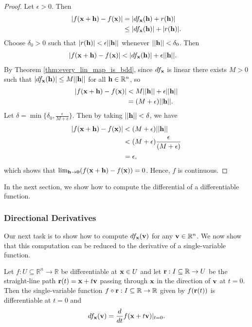 \documentclass[12pt,letterpaper,reqno]{article}
\numberwithin{equation}{section}
\newcommand{\bh}{{\bf h}}
\newcommand{\R}{\ensuremath{\mathbb R}}
\newcommand{\zv}{{\bf 0}}
\newcommand{\bv}{{\bf v}}
\newcommand{\bx}{{\bf x}}
\newcommand{\bbr}{{\bf r}}
\begin{document}
{\begin{proof}
	Let $\epsilon>0$. Then
	\begin{align*}
		|f(\bx+\bh)-f(\bx)|&=|df_\bx(\bh)+r(\bh)| \\
		&\leq |df_\bx(\bh)|+|r(\bh)|.
	\end{align*}
Choose $\delta_0>0$ such that $|r(\bh)|<\epsilon ||\bh||$ whenever $||\bh||<\delta_0$. Then
\begin{align*}
	|f(\bx+\bh)-f(\bx)|&<|df_\bx(\bh)|+\epsilon ||\bh||.
\end{align*}
By Theorem \ref{thm:every_lin_map_is_bdd}, since $df_\bx$ is linear there exists $M>0$ such that $|df_\bx(\bh)|\leq M ||\bh||$ for all $\bh \in \R^n$, so 
\begin{align*}
	|f(\bx+\bh)-f(\bx)|&< M ||\bh||+\epsilon ||\bh|| \\
&=(M +\epsilon)||\bh||.
\end{align*}
Let $\delta=\min\{\delta_0,\frac{\epsilon}{M +\epsilon}\}$. Then by taking $||\bh||<\delta$, we have
\begin{align*}
	|f(\bx+\bh)-f(\bx)|&<(M +\epsilon)||\bh|| \\
&<(M +\epsilon)\frac{\epsilon}{(M +\epsilon)} \\
&=\epsilon,
\end{align*}
which shows that $\lim_{\bh \to \zv} (f(\bx+\bh)-f(\bx))=0$. Hence, $f$ is continuous.
\end{proof}

In the next section, we show how to compute the differential of a differentiable function.

\subsubsection{Directional Derivatives}
Our next task is to show how to compute $df_\bx(\bv)$ for any $\bv \in \R^n$. We now show that this computation can be reduced to the derivative of a single-variable function. 

\begin{thm}\label{thm:computation_of_the_differential}
Let $f:U \subseteq \R^n \to \R$ be differentiable at $\bx \in U$ and let $\bbr: I\subseteq \R \to U$ be the straight-line path $\bbr(t)=\bx+t\bv$ passing through $\bx$ in the direction of $\bv$ at $t=0$. Then the single-variable function $f \circ \bbr :I \subseteq \R \to \R$ given by $f(\bbr(t))$ is differentiable at $t=0$ and 
\begin{align*}
	df_\bx(\bv)=\frac{d}{dt}f(\bx+t\bv)|_{t=0}.
\end{align*}	
\end{thm}

}
\end{document}

